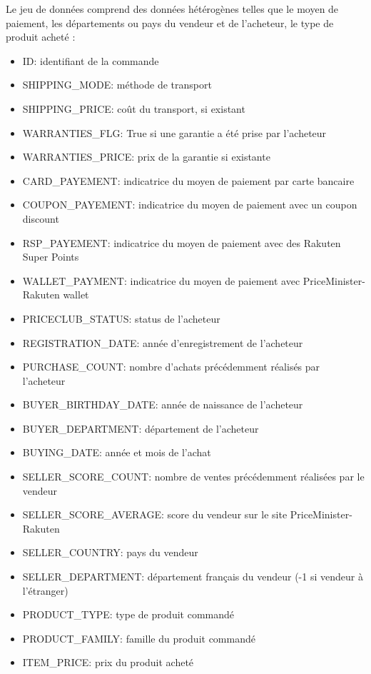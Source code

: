 Le jeu de données comprend des données hétérogènes telles que le moyen de paiement, les
départements ou pays du vendeur et de l'acheteur, le type de produit acheté :

\begin{itemize}
\item ID: identifiant de la commande
\item SHIPPING_MODE: méthode de transport
\item SHIPPING_PRICE: coût du transport, si existant
\item WARRANTIES_FLG: True si une garantie a été prise par l'acheteur
\item WARRANTIES_PRICE: prix de la garantie si existante
\item CARD_PAYEMENT: indicatrice du moyen de paiement par carte bancaire
\item COUPON_PAYEMENT: indicatrice du moyen de paiement avec un coupon discount 
\item RSP_PAYEMENT: indicatrice du moyen de paiement avec des Rakuten Super Points
\item WALLET_PAYMENT: indicatrice du moyen de paiement avec PriceMinister-Rakuten wallet
\item PRICECLUB_STATUS: status de l'acheteur
\item REGISTRATION_DATE: année d'enregistrement de l'acheteur
\item PURCHASE_COUNT: nombre d'achats précédemment réalisés par l'acheteur
\item BUYER_BIRTHDAY_DATE: année de naissance de l'acheteur
\item BUYER_DEPARTMENT: département de l'acheteur
\item BUYING_DATE: année et mois de l'achat
\item SELLER_SCORE_COUNT: nombre de ventes précédemment réalisées par le vendeur
\item SELLER_SCORE_AVERAGE: score du vendeur sur le site PriceMinister-Rakuten
\item SELLER_COUNTRY: pays du vendeur
\item SELLER_DEPARTMENT: département français du vendeur (-1 si vendeur à l'étranger)
\item PRODUCT_TYPE: type de produit commandé
\item PRODUCT_FAMILY: famille du produit commandé
\item ITEM_PRICE: prix du produit acheté

\end{itemize}

